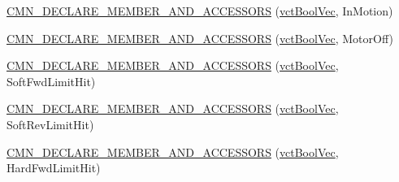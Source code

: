 {\bf }\par
\begin{DoxyCompactItemize}
\item 
\hyperlink{classprm_actuator_state_aa7fec77a2f9d588396aca3e9aab01ba5}{C\+M\+N\+\_\+\+D\+E\+C\+L\+A\+R\+E\+\_\+\+M\+E\+M\+B\+E\+R\+\_\+\+A\+N\+D\+\_\+\+A\+C\+C\+E\+S\+S\+O\+R\+S} (\hyperlink{vct_dynamic_vector_types_8h_aeb2237c134aee3769198bd9d55c8a9e0}{vct\+Bool\+Vec}, In\+Motion)
\end{DoxyCompactItemize}

{\bf }\par
\begin{DoxyCompactItemize}
\item 
\hyperlink{classprm_actuator_state_ae9a9d598176d8a3134df160d5e53ca57}{C\+M\+N\+\_\+\+D\+E\+C\+L\+A\+R\+E\+\_\+\+M\+E\+M\+B\+E\+R\+\_\+\+A\+N\+D\+\_\+\+A\+C\+C\+E\+S\+S\+O\+R\+S} (\hyperlink{vct_dynamic_vector_types_8h_aeb2237c134aee3769198bd9d55c8a9e0}{vct\+Bool\+Vec}, Motor\+Off)
\end{DoxyCompactItemize}

{\bf }\par
\begin{DoxyCompactItemize}
\item 
\hyperlink{classprm_actuator_state_a98c7cafdaf39eefe31ccff2d715ad3c0}{C\+M\+N\+\_\+\+D\+E\+C\+L\+A\+R\+E\+\_\+\+M\+E\+M\+B\+E\+R\+\_\+\+A\+N\+D\+\_\+\+A\+C\+C\+E\+S\+S\+O\+R\+S} (\hyperlink{vct_dynamic_vector_types_8h_aeb2237c134aee3769198bd9d55c8a9e0}{vct\+Bool\+Vec}, Soft\+Fwd\+Limit\+Hit)
\end{DoxyCompactItemize}

{\bf }\par
\begin{DoxyCompactItemize}
\item 
\hyperlink{classprm_actuator_state_a3c0d4d97c7d7ecb7efb1abcc5975bdbb}{C\+M\+N\+\_\+\+D\+E\+C\+L\+A\+R\+E\+\_\+\+M\+E\+M\+B\+E\+R\+\_\+\+A\+N\+D\+\_\+\+A\+C\+C\+E\+S\+S\+O\+R\+S} (\hyperlink{vct_dynamic_vector_types_8h_aeb2237c134aee3769198bd9d55c8a9e0}{vct\+Bool\+Vec}, Soft\+Rev\+Limit\+Hit)
\end{DoxyCompactItemize}

{\bf }\par
\begin{DoxyCompactItemize}
\item 
\hyperlink{classprm_actuator_state_ac109c664b1447bed87450fade3a6d500}{C\+M\+N\+\_\+\+D\+E\+C\+L\+A\+R\+E\+\_\+\+M\+E\+M\+B\+E\+R\+\_\+\+A\+N\+D\+\_\+\+A\+C\+C\+E\+S\+S\+O\+R\+S} (\hyperlink{vct_dynamic_vector_types_8h_aeb2237c134aee3769198bd9d55c8a9e0}{vct\+Bool\+Vec}, Hard\+Fwd\+Limit\+Hit)
\end{DoxyCompactItemize}


